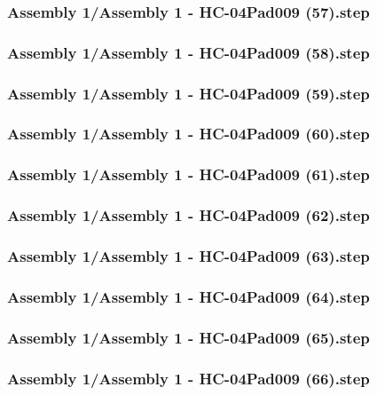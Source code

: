 \documentclass[a4paper,12pt]{article}
\begin{document}
\subsubsection{Assembly 1/Assembly 1 - HC-04Pad009 (57).step}

\subsubsection{Assembly 1/Assembly 1 - HC-04Pad009 (58).step}

\subsubsection{Assembly 1/Assembly 1 - HC-04Pad009 (59).step}

\subsubsection{Assembly 1/Assembly 1 - HC-04Pad009 (60).step}

\subsubsection{Assembly 1/Assembly 1 - HC-04Pad009 (61).step}

\subsubsection{Assembly 1/Assembly 1 - HC-04Pad009 (62).step}

\subsubsection{Assembly 1/Assembly 1 - HC-04Pad009 (63).step}

\subsubsection{Assembly 1/Assembly 1 - HC-04Pad009 (64).step}

\subsubsection{Assembly 1/Assembly 1 - HC-04Pad009 (65).step}

\subsubsection{Assembly 1/Assembly 1 - HC-04Pad009 (66).step}

\end{document}
